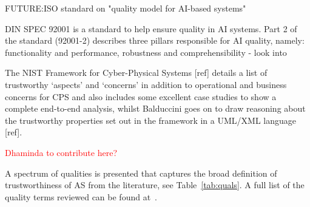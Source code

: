 FUTURE:ISO standard on "quality model for AI-based systems"


DIN SPEC 92001 is a standard to help ensure quality in AI systems. Part 2 of the standard (92001-2) describes three pillars responsible for AI quality, namely: functionality and performance, robustness and comprehensibility - look into

The NIST Framework for Cyber-Physical Systems [ref] details a list of trustworthy `aspects' and `concerns' in addition to operational and business concerns for CPS and also includes some excellent case studies to show a complete end-to-end analysis, whilst Balduccini goes on to draw reasoning about the trustworthy properties set out in the framework in a UML/XML language [ref].  
%











\textcolor{red}{Dhaminda to contribute here?}


A spectrum of qualities is presented that captures the broad definition of trustworthiness of AS from the literature, see Table~\ref{tab:quals}. A full list of the quality terms reviewed can be found at~\cite{tsl_git}.

